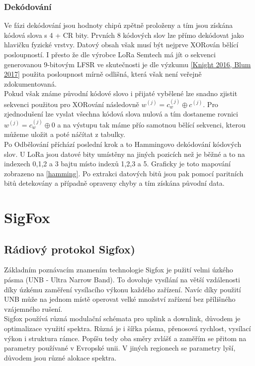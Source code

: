 \documentclass{ctuthesis}
\begin{document}
\subsection{Dekódování}
Ve fázi dekódování jsou hodnoty chipů zpětně proloženy a tím jsou získána kódová slova s 4 + CR bity. Prvních 8 kódových slov lze přímo dekódovat jako hlavičku fyzické vrstvy. Datový obsah však musí být nejprve XORován bělící posloupností. I přesto že dle výrobce LoRa Semtech má jít o sekvenci generovanou 9-bitovým LFSR ve skutečnosti je dle výzkumu \ref{Knight 2016, Blum 2017} použita posloupnost mírně odlišná, která však není veřejně zdokumentovaná.\\
Pokud však známe původní  kódové slovo i přijaté vybělené lze snadno zjistit sekvenci použitou pro XORování následovně
$w^{(j)} = c_w^{(j)} \oplus c^{(j)}$. Pro zjednodušení lze vyslat všechna kódová slova nulová a tím dostaneme rovnici $w^{(j)} = c_w^{(j)} \oplus 0$ a na výstupu tak máme přío samotnou bělící sekvenci, kterou můžeme uložit a poté náčítat z tabulky. \\
Po Odbělování příchází poslední krok a to Hammingovo dekódování kódových slov. U LoRa jsou datové bity umístěny na jiných pozicích než je běžné a to na indexech 0,1,2 a 3 bajtu místo indexů 1,2,3 a 5. Graficky je toto mapování zobrazeno na \ref{hamming}. Po extrakci datových bitů jsou pak pomocí paritních bitů detekovány a případně opraveny chyby a tím získána původní data.


\chapter{SigFox}
\section{Rádiový protokol Sigfox)}

Základním poznávacím znamením technologie Sigfox je pužití velmi úzkého pásma (UNB - Ultra Narrow Band). To dovoluje vysílání na větší vzdálenosti díky úzkému zaměření vysílacího výkonu každého zařízení. Navíc díky použití UNB může na jednom místě operovat velké množství zařízení bez přílišného vzájemného rušení. \\
Sigfox používá různá modulační schémata pro uplink a downlink, důvodem je optimalizace využití spektra. Různá je i šířka pásma, přenosová rychlost, vysílací výkon i struktura rámce. Popíšu tedy oba směry zvlášť a zaměřím se přitom na parametry používané v Evropské unii. V jiných regionech se parametry lyší, důvodem jsou různé alokace spektra.
\end{document}
